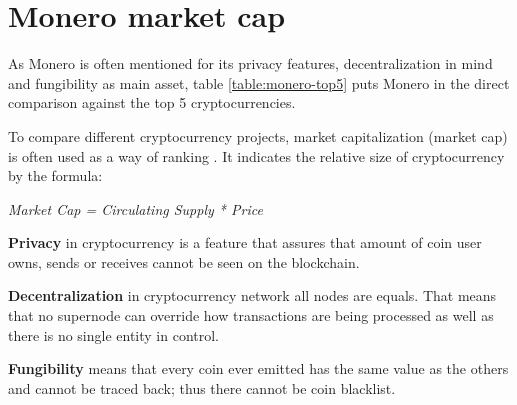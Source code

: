\documentclass[
  printed, %
  table,   %
  lof,     %
  lot,     %
           oneside, color
]{fithesis3}
\begin{document}

\section{Monero market cap}
 As Monero is often mentioned for its privacy features, decentralization in mind and fungibility as main asset, table \ref{table:monero-top5} puts Monero in the direct comparison against the top 5 cryptocurrencies.

To compare different cryptocurrency projects, market capitalization (market cap) is often used as a way of ranking \cite{elbahrawy2017evolutionary}. It indicates the relative size of cryptocurrency by the formula: \\ \centerline{
 \textit{\textit{Market Cap = Circulating Supply * Price} }}
 
\textbf{Privacy} in cryptocurrency is a feature that assures that amount of coin user owns, sends or receives cannot be seen on the blockchain.

\textbf{Decentralization} in cryptocurrency network all nodes are equals. That means that no supernode can override how transactions are being processed as well as there is no single entity in control.

\textbf{Fungibility} means that every coin ever emitted has the same value as the others and cannot be traced back; thus there cannot be coin blacklist.
\end{document}
